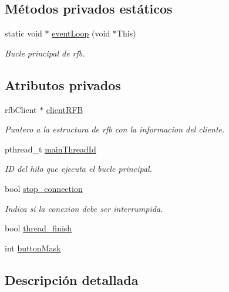 \subsection*{Métodos privados estáticos}
\begin{DoxyCompactItemize}
\item 
static void $\ast$ \hyperlink{classClientConnectionRFB_a0b947e3c7e64b3c04088eee75508cae4}{event\-Loop} (void $\ast$This)
\begin{DoxyCompactList}\small\item\em Bucle principal de rfb. \end{DoxyCompactList}\end{DoxyCompactItemize}
\subsection*{Atributos privados}
\begin{DoxyCompactItemize}
\item 
rfb\-Client $\ast$ \hyperlink{classClientConnectionRFB_a7e3efe49516da3950ca4a8c8084ba872}{client\-R\-F\-B}
\begin{DoxyCompactList}\small\item\em Puntero a la estructura de rfb con la informacion del cliente. \end{DoxyCompactList}\item 
pthread\-\_\-t \hyperlink{classClientConnectionRFB_ace0de911ed81b46a190032fc9d0792e8}{main\-Thread\-Id}
\begin{DoxyCompactList}\small\item\em I\-D del hilo que ejecuta el bucle principal. \end{DoxyCompactList}\item 
bool \hyperlink{classClientConnectionRFB_a6abf99187b5b7f796903e60537bad442}{stop\-\_\-connection}
\begin{DoxyCompactList}\small\item\em Indica si la conexion debe ser interrumpida. \end{DoxyCompactList}\item 
bool \hyperlink{classClientConnectionRFB_abed37570b0fcc1acfae40cfca845c332}{thread\-\_\-finish}
\item 
int \hyperlink{classClientConnectionRFB_a716c3e543a42d2eb9163d831d7f7d9c0}{button\-Mask}
\end{DoxyCompactItemize}


\subsection{Descripción detallada}


